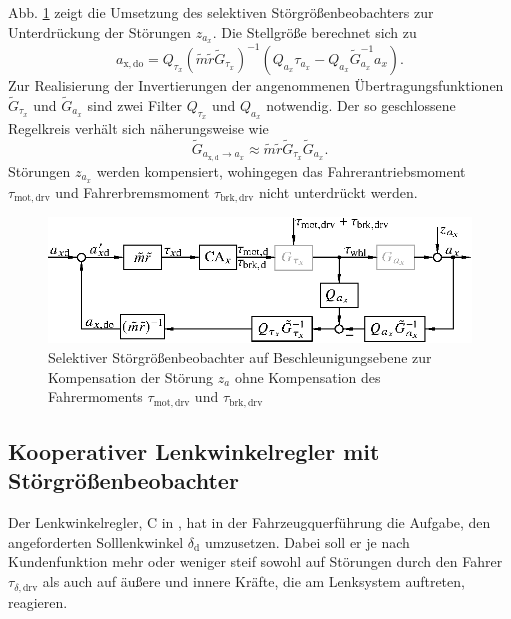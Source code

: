 Abb. \ref{fig:DO_acceleration} zeigt die Umsetzung des selektiven Störgrößenbeobachters zur Unterdrückung der Störungen $z_{a_x}$.  Die Stellgröße berechnet sich zu
\begin{equation}
a_\mathrm{x,do} = Q_{\tau_x} \left(\tilde m \tilde r\tilde G_{\tau_x}\right)^{-1} \left( Q_{a_x} \tau_{a_x} - Q_{a_x} \tilde{G}_{a_x}^{-1} a_x \right).
\end{equation}
Zur Realisierung der Invertierungen der angenommenen Übertragungsfunktionen $\tilde G_{\tau_x}$ und $\tilde G_{a_x}$ sind zwei Filter $Q_{\tau_x}$ und $Q_{a_x}$ notwendig.  Der so geschlossene Regelkreis verhält sich näherungsweise wie
\begin{equation}
\tilde G_{a_\mathrm{x,d}\rightarrow a_x} \approx \tilde m \tilde r\tilde G_{\tau_x}  \tilde G_{a_x}.
\end{equation}
% 
Störungen $z_{a_x}$ werden kompensiert,  wohingegen das Fahrerantriebsmoment $\tau_\mathrm{mot,drv}$ und Fahrerbremsmoment $\tau_\mathrm{brk,drv}$ nicht unterdrückt werden.
\begin{figure}[ht]
	\centering
	\includegraphics{Bilder/DO_allg/do_acceleration.eps}
	\caption{Selektiver Störgrößenbeobachter auf Beschleunigungsebene zur Kompensation der Störung $z_a$ ohne Kompensation des Fahrermoments $\tau_\mathrm{mot,drv}$ und $\tau_\mathrm{brk,drv}$}
	\label{fig:DO_acceleration}
\end{figure}



\subsection{Kooperativer Lenkwinkelregler mit Störgrößenbeobachter}\label{subS:DO_Delta}

Der Lenkwinkelregler, C\sus{$\delta$} in , hat in der Fahrzeugquerführung die Aufgabe, den angeforderten Solllenkwinkel $\delta_\mathrm{d}$ umzusetzen. Dabei soll er je nach Kundenfunktion mehr oder weniger steif sowohl auf Störungen durch den Fahrer $\tau_{\delta,\mathrm{drv}}$ als auch auf äußere und innere Kräfte, die am Lenksystem auftreten, reagieren.

